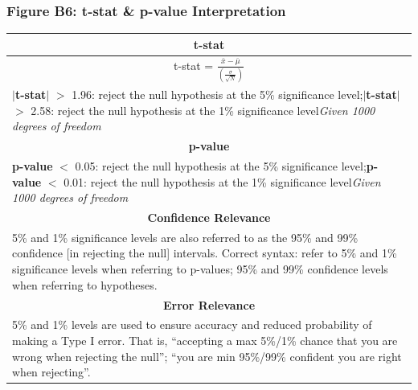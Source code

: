 \documentclass[11pt, english]{article}
\begin{document}
		\subsubsection*{Figure B6: t-stat \& p-value Interpretation}

		\begin{table}[h]
			\scriptsize
			\renewcommand{\arraystretch}{1.25}
		\begin{center}
		\begin{tabular}{p{13cm}}
			\hline
			\multicolumn{1}{c}{\textbf{t-stat}}\\
			\hline
			\multicolumn{1}{c}{t-stat = $\mathit{\frac{\bar{x}-\bar{\mu}}{\left(\frac{\sigma}{\sqrt{N}}\right)}}$}\\
			\textbf{$|$t-stat$|$} $>$ 1.96: reject the null hypothesis at the 5\% significance level;\newline \textbf{$|$t-stat$|$} $>$ 2.58: reject the null hypothesis at the 1\% significance level\newline \textit{Given 1000 degrees of freedom}\\
			\hline
			\multicolumn{1}{c}{\textbf{p-value}}\\
			\hline
			\textbf{p-value} $<$ 0.05: reject the null hypothesis at the 5\% significance level;\newline \textbf{p-value} $<$ 0.01: reject the null hypothesis at the 1\% significance level\newline \textit{Given 1000 degrees of freedom}\\
			\hline
			\multicolumn{1}{c}{\textbf{Confidence Relevance}}\\
			\hline
			5\% and 1\% significance levels are also referred to as the 95\% and 99\% confidence [in rejecting the null] intervals. Correct syntax: refer to 5\% and 1\% significance levels when referring to p-values; 95\% and 99\% confidence levels when referring to hypotheses.\\
			\hline
			\multicolumn{1}{c}{\textbf{Error Relevance}}\\
			\hline
			5\% and 1\% levels are used to ensure accuracy and reduced probability of making a Type I error. That is, ``accepting a max 5\%/1\% chance that you are wrong when rejecting the null”; ``you are min 95\%/99\% confident you are right when rejecting”.\\
			\hline
		\end{tabular}
		\end{center}
		\end{table}
\end{document}
